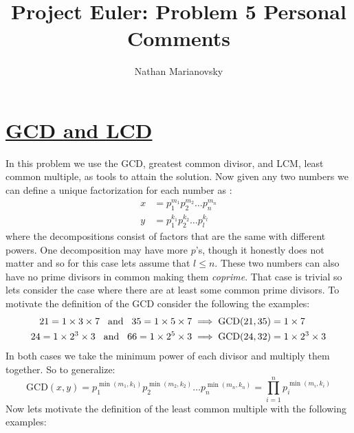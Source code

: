 \documentclass[12pt, letterpaper, onecolumn, conference, final]{IEEEtran}
\title{Project Euler: Problem 5 Personal Comments}
\author{Nathan Marianovsky}
\theoremstyle{definition}
\theoremstyle{plain}
\begin{document}
\maketitle

\section*{\underline{\Large{GCD and LCD}}}
\vspace{.3cm}
\noindent
In this problem we use the GCD, greatest common divisor, and LCM, least common multiple, as tools to attain the solution. Now given any two numbers we can define a unique factorization for each number as \footnotemark :
\begin{equation*}
\begin{split}
x &= p_1^{m_1} p_2^{m_2} \dots p_n^{m_n} \\
y &= p_1^{k_1} p_2^{k_2} \dots p_l^{k_l}
\end{split}
\end{equation*}
where the decompositions consist of factors that are the same with different powers. One decomposition may have more $p$'s, though it honestly does not matter and so for this case lets assume that $l \leq n$. These two numbers can also have no prime divisors in common making them \textit{coprime}. That case is trivial so lets consider the case where there are at least some common prime divisors. To motivate the definition of the GCD consider the following the examples:
\begin{equation*}
\begin{split}
21 = 1 \times 3 \times 7 \hspace{.3cm} \text{and} \hspace{.3cm} 35 = 1 \times 5 \times 7 &\implies \text{GCD}(21, 35) = 1 \times 7 \\
24 = 1 \times 2^3 \times 3 \hspace{.3cm} \text{and} \hspace{.3cm} 66 = 1 \times 2^5 \times 3 &\implies \text{GCD}(24, 32) = 1 \times 2^3 \times 3
\end{split}
\end{equation*}
In both cases we take the minimum power of each divisor and multiply them together. So to generalize:
\begin{equation*}
\text{GCD}(x,y) = p_1^{\min(m_1,k_1)} p_2^{\min(m_2,k_2)} \dots p_n^{\min(m_n,k_n)} = \prod_{i=1}^n p_i^{\min(m_i,k_i)}
\end{equation*}
Now lets motivate the definition of the least common multiple with the following examples:
\end{document}
